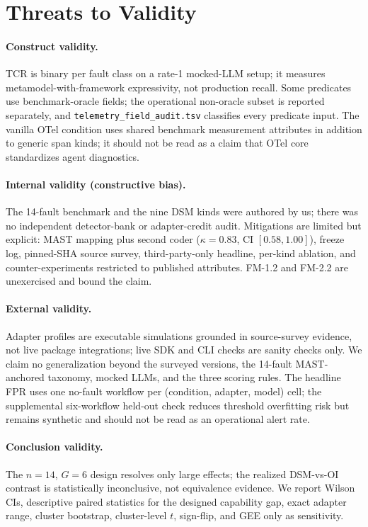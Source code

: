 \documentclass[a4paper,UKenglish,cleveref,autoref,thm-restate]{lipics-v2021}
\begin{document}
\section{Threats to Validity}
\label{sec:threats}

\paragraph*{Construct validity.}
TCR is binary per fault class on a rate-1 mocked-LLM setup; it
measures metamodel-with-framework expressivity, not production
recall. Some predicates use benchmark-oracle fields; the operational
non-oracle subset is reported separately, and
\texttt{telemetry\_field\_audit.tsv} classifies every predicate input.
The vanilla OTel condition uses shared benchmark measurement
attributes in addition to generic span kinds; it should not be read
as a claim that OTel core standardizes agent diagnostics.

\paragraph*{Internal validity (constructive bias).}
The 14-fault benchmark and the nine DSM kinds were authored by us;
there was no independent detector-bank or adapter-credit audit.
Mitigations are limited but explicit: MAST mapping plus second coder
($\kappa=0.83$, CI $[0.58,1.00]$), freeze log, pinned-SHA source
survey, third-party-only headline, per-kind ablation, and
counter-experiments restricted to published attributes. FM-1.2 and
FM-2.2 are unexercised and bound the claim.

\paragraph*{External validity.}
Adapter profiles are executable simulations grounded in
source-survey evidence, not live package integrations; live SDK and
CLI checks are sanity checks only. We claim no generalization beyond
the surveyed versions, the 14-fault MAST-anchored taxonomy, mocked
LLMs, and the three scoring rules. The headline FPR uses one
no-fault workflow per (condition, adapter, model) cell; the
supplemental six-workflow held-out check reduces threshold overfitting
risk but remains synthetic and should not be read as an operational
alert rate.

\paragraph*{Conclusion validity.}
The $n=14$, $G=6$ design resolves only large effects; the realized
DSM-vs-OI contrast is statistically inconclusive, not equivalence
evidence. We report Wilson CIs, descriptive paired statistics for the
designed capability gap, exact adapter range, cluster bootstrap,
cluster-level $t$, sign-flip, and GEE only as sensitivity.
\end{document}
